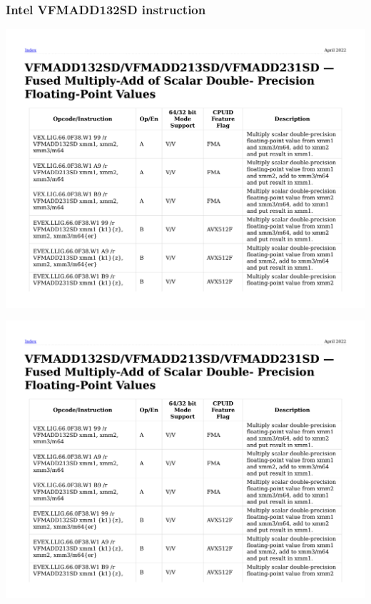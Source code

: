 \documentclass{beamer}
\begin{document}
\begin{frame}[fragile]
\frametitle{Intel VFMADD132SD instruction}
\includegraphics[page=1, clip, trim=0in 2.9in 0in 0.75in, width=\textwidth]{FVMADD132SD.pdf}

\includegraphics[page=4, clip, trim=0in 3.75in 0in 3.5in, width=\textwidth]{FVMADD132SD.pdf}
\end{frame}
\end{document}
